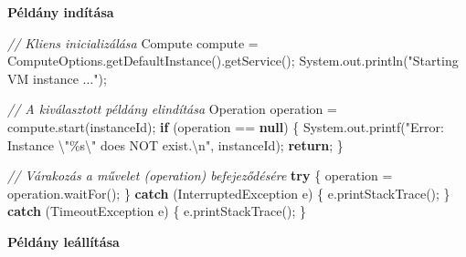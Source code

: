 \documentclass[
]{article}
\newenvironment{Shaded}{}{}
\newcommand{\BuiltInTok}[1]{\textcolor[rgb]{0.00,0.50,0.00}{#1}}
\newcommand{\CommentTok}[1]{\textcolor[rgb]{0.38,0.63,0.69}{\textit{#1}}}
\newcommand{\ControlFlowTok}[1]{\textcolor[rgb]{0.00,0.44,0.13}{\textbf{#1}}}
\newcommand{\FunctionTok}[1]{\textcolor[rgb]{0.02,0.16,0.49}{#1}}
\newcommand{\KeywordTok}[1]{\textcolor[rgb]{0.00,0.44,0.13}{\textbf{#1}}}
\newcommand{\NormalTok}[1]{#1}
\newcommand{\OperatorTok}[1]{\textcolor[rgb]{0.40,0.40,0.40}{#1}}
\newcommand{\SpecialCharTok}[1]{\textcolor[rgb]{0.25,0.44,0.63}{#1}}
\newcommand{\StringTok}[1]{\textcolor[rgb]{0.25,0.44,0.63}{#1}}
\begin{document}
\textbf{Példány indítása}

\begin{Shaded}
\begin{Highlighting}[]
\CommentTok{// Kliens inicializálása}
\NormalTok{Compute compute }\OperatorTok{=}\NormalTok{ ComputeOptions}\OperatorTok{.}\FunctionTok{getDefaultInstance}\OperatorTok{().}\FunctionTok{getService}\OperatorTok{();}
\BuiltInTok{System}\OperatorTok{.}\FunctionTok{out}\OperatorTok{.}\FunctionTok{println}\OperatorTok{(}\StringTok{"Starting VM instance ..."}\OperatorTok{);}

\CommentTok{// A kiválasztott példány elindítása}
\BuiltInTok{Operation}\NormalTok{ operation }\OperatorTok{=}\NormalTok{ compute}\OperatorTok{.}\FunctionTok{start}\OperatorTok{(}\NormalTok{instanceId}\OperatorTok{);}
\ControlFlowTok{if} \OperatorTok{(}\NormalTok{operation }\OperatorTok{==} \KeywordTok{null}\OperatorTok{)} \OperatorTok{\{}
    \BuiltInTok{System}\OperatorTok{.}\FunctionTok{out}\OperatorTok{.}\FunctionTok{printf}\OperatorTok{(}\StringTok{"Error: Instance }\SpecialCharTok{\textbackslash{}"\%s\textbackslash{}"}\StringTok{ does NOT exist.}\SpecialCharTok{\textbackslash{}n}\StringTok{"}\OperatorTok{,}\NormalTok{ instanceId}\OperatorTok{);}
    \ControlFlowTok{return}\OperatorTok{;}
\OperatorTok{\}}

\CommentTok{// Várakozás a művelet (operation) befejeződésére}
\ControlFlowTok{try} \OperatorTok{\{}
\NormalTok{    operation }\OperatorTok{=}\NormalTok{ operation}\OperatorTok{.}\FunctionTok{waitFor}\OperatorTok{();}
\OperatorTok{\}} \ControlFlowTok{catch} \OperatorTok{(}\BuiltInTok{InterruptedException}\NormalTok{ e}\OperatorTok{)} \OperatorTok{\{}
\NormalTok{    e}\OperatorTok{.}\FunctionTok{printStackTrace}\OperatorTok{();}
\OperatorTok{\}} \ControlFlowTok{catch} \OperatorTok{(}\BuiltInTok{TimeoutException}\NormalTok{ e}\OperatorTok{)} \OperatorTok{\{}
\NormalTok{    e}\OperatorTok{.}\FunctionTok{printStackTrace}\OperatorTok{();}
\OperatorTok{\}}
\end{Highlighting}
\end{Shaded}

\textbf{Példány leállítása}
\end{document}
